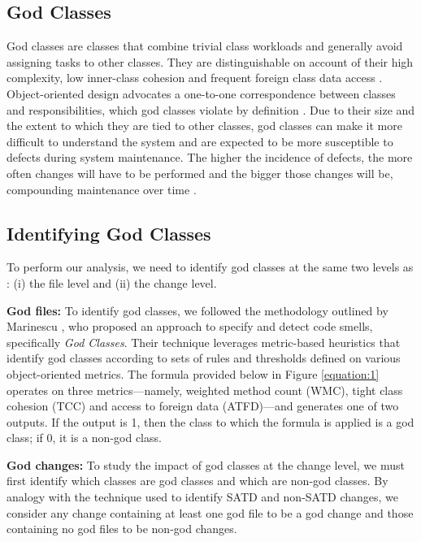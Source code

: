 \subsection{God Classes}
God classes are classes that combine trivial class workloads and generally avoid assigning tasks to other classes. They are distinguishable on account of their high complexity, low inner-class cohesion and frequent foreign class data access \cite{lanza2007object}. Object-oriented design advocates a one-to-one correspondence between classes and responsibilities, which god classes violate by definition \cite{lanza2007object}. Due to their size and the extent to which they are tied to other classes, god classes can make it more difficult to understand the system \cite{fowler1999refactoring} and are expected to be more susceptible to defects during system maintenance. The higher the incidence of defects, the more often changes will have to be performed and the bigger those changes will be, compounding maintenance over time \cite{fowler1999refactoring, lanza2007object}.

\subsection{Identifying God Classes}
\label{ch4_god}

To perform our analysis, we need to identify god classes at the same two levels as \SATD: (i) the file level and (ii) the change level.

\noindent\textbf{God files:} To identify god classes, we followed the methodology outlined by Marinescu \cite{marinescu2004detection}, who proposed an approach to specify and detect
code smells, specifically \textit{God Classes}. Their technique leverages metric-based heuristics that identify god classes according to sets of rules and thresholds defined on various object-oriented metrics. The formula provided below in Figure \ref{equation:1} operates on three metrics---namely, weighted method count (WMC), tight class cohesion (TCC) and access to foreign data (ATFD)---and generates one of two outputs. If the output is 1, then the class to which the formula is applied is a god class; if 0, it is a non-god class.

\noindent\textbf{God changes:}
To study the impact of god classes at the change level, we must first identify which classes are god classes and which are non-god classes. By analogy with the technique used to identify SATD and non-SATD changes, we consider any change containing at least one god file to be a god change and those containing no god files to be non-god changes. 


